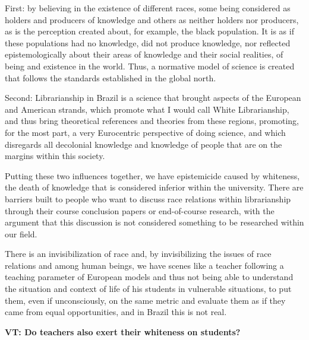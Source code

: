 \documentclass[a4paper,
fontsize=11pt,
oneside,
numbers=noperiodatend,
parskip=half-,
bibliography=totoc,
final
]{scrartcl}
\begin{document}
First: by believing in the existence of different races, some being
considered as holders and producers of knowledge and others as neither
holders nor producers, as is the perception created about, for example,
the black population. It is as if these populations had no knowledge,
did not produce knowledge, nor reflected epistemologically about their
areas of knowledge and their social realities, of being and existence in
the world. Thus, a normative model of science is created that follows
the standards established in the global north.

Second: Librarianship in Brazil is a science that brought aspects of the
European and American strands, which promote what I would call White
Librarianship, and thus bring theoretical references and theories from
these regions, promoting, for the most part, a very Eurocentric
perspective of doing science, and which disregards all decolonial
knowledge and knowledge of people that are on the margins within this
society.

Putting these two influences together, we have epistemicide caused by
whiteness, the death of knowledge that is considered inferior within the
university. There are barriers built to people who want to discuss race
relations within librarianship through their course conclusion papers or
end-of-course research, with the argument that this discussion is not
considered something to be researched within our field.

There is an invisibilization of race and, by invisibilizing the issues
of race relations and among human beings, we have scenes like a teacher
following a teaching parameter of European models and thus not being
able to understand the situation and context of life of his students in
vulnerable situations, to put them, even if unconsciously, on the same
metric and evaluate them as if they came from equal opportunities, and
in Brazil this is not real.

\textbf{VT: Do teachers also exert their whiteness on students?}
\end{document}
